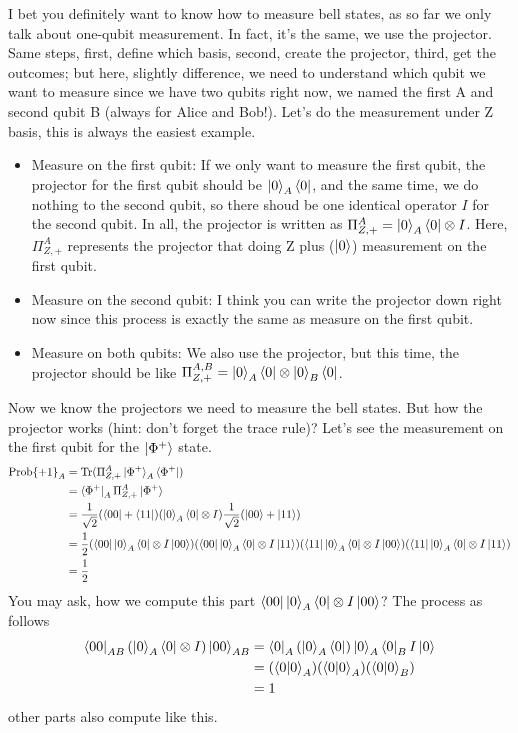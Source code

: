 \documentclass[11pt, letterpaper]{article}
\begin{document}
I bet you definitely want to know how to measure bell states, as so far we only talk about one-qubit measurement. In fact, it's the same, we use the projector. Same steps, first, define which basis, second, create the projector, third, get the outcomes; but here, slightly difference, we need to understand which qubit we want to measure since we have two qubits right now, we named the first A and second qubit B (always for Alice and Bob!). Let's do the measurement under Z basis, this is always the easiest example.
\begin{itemize}
  \item Measure on the first qubit: If we only want to measure the first qubit, the projector for the first qubit should be $\ket{0}_A\bra{0}$, and the same time, we do nothing to the second qubit, so there shoud be one identical operator $I$ for the second qubit. In all, the projector is written as $\Pi_{Z, +}^{A} = \ket{0}_A\bra{0} \otimes I$. Here, $\Pi_{Z, +}^{A}$ represents the projector that doing Z plus ($\ket{0}$) measurement on the first qubit.
  \item Measure on the second qubit: I think you can write the projector down right now since this process is exactly the same as measure on the first qubit.
  \item Measure on both qubits: We also use the projector, but this time, the projector should be like $\Pi_{Z, +}^{A, B} = \ket{0}_A\bra{0} \otimes \ket{0}_B\bra{0}$.
\end{itemize}

Now we know the projectors we need to measure the bell states. But how the projector works (hint: don't forget the trace rule)? Let's see the measurement on the first qubit for the $\ket{\Phi^+}$ state.
\begin{equation}
  \begin{aligned}
    \text{Prob\{+1\}}_A &= \text{Tr}(\Pi_{Z, +}^{A}\ket{\Phi^+}_A\bra{\Phi^+}) \\
    &= \bra{\Phi^+}_A \Pi_{Z, +}^{A} \ket{\Phi^+} \\
    & = \frac{1}{\sqrt{2}}(\bra{00} + \bra{11})(\ket{0}_A\bra{0} \otimes I)\frac{1}{\sqrt{2}}(\ket{00} + \ket{11}) \\
    & = \frac{1}{2}(\bra{00}\ket{0}_A\bra{0} \otimes I\ket{00})(\bra{00}\ket{0}_A\bra{0} \otimes I\ket{11})(\bra{11}\ket{0}_A\bra{0} \otimes I\ket{00})(\bra{11}\ket{0}_A\bra{0} \otimes I\ket{11}) \\
    & = \frac{1}{2}
  \end{aligned}
\end{equation}
You may ask, how we compute this part $\bra{00}\ket{0}_A\bra{0} \otimes I\ket{00}$? The process as follows
\begin{equation}
  \begin{aligned}
    \bra{00}_{AB}(\ket{0}_A\bra{0} \otimes I)\ket{00}_{AB} &= \bra{0}_A(\ket{0}_A\bra{0})\ket{0}_A\bra{0}_BI\ket{0}\\
    & =  (\braket{0|0}_A)(\braket{0|0}_A)(\braket{0|0}_B) \\
    & = 1
  \end{aligned}
\end{equation}
other parts also compute like this.
\end{document}
